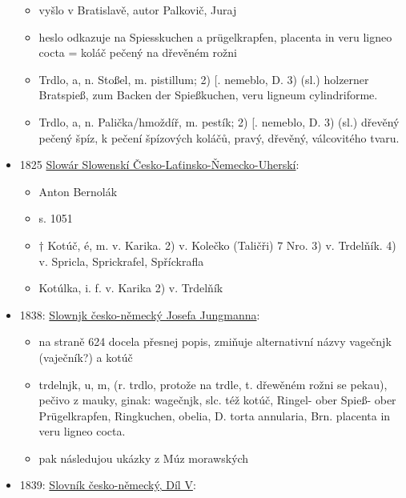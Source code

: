 \begin{itemize}
  \begin{itemize}
  \tightlist
  \item
    vyšlo v Bratislavě, autor Palkovič, Juraj
  \item
    heslo odkazuje na Spiesskuchen a prügelkrapfen, placenta in veru
    ligneo cocta = koláč pečený na dřevěném rožni
  \item
    Trdlo, a, n. Stoßel, m. pistillum; 2) {[}. nemeblo, D. 3) (sl.)
    holzerner Bratspieß, zum Backen der Spießkuchen, veru ligneum
    cylindriforme.
  \item
    Trdlo, a, n. Palička/hmoždíř, m. pestík; 2) {[}. nemeblo, D. 3)
    (sl.) dřevěný pečený špíz, k pečení špízových koláčů, pravý,
    dřevěný, válcovitého tvaru.
  \end{itemize}
\item
  1825
  \href{https://www.google.cz/books/edition/Slow\%C3\%A1r_Slowensk\%C3\%AD_\%C4\%8Cesko_La\%C5\%A5insko_\%C5\%87em/Sd1bAAAAcAAJ?hl=cs&gbpv=1&dq=trdeln\%C3\%ADk&pg=PA1051&printsec=frontcover}{Slowár
  Slowenskí Česko-Laťinsko-Ňemecko-Uherskí}:

  \begin{itemize}
  \tightlist
  \item
    Anton Bernolák
  \item
    s. 1051
  \item
    † Kotúč, é, m. v. Karika. 2) v. Kolečko (Taličři) 7 Nro. 3) v.
    Trdelňík. 4) v. Spricla, Sprickrafel, Spříckrafla
  \item
    Kotúlka, i. f. v. Karika 2) v. Trdelňík
  \end{itemize}
\item
  1838:
  \href{https://ndk.cz/uuid/uuid:b6d79670-8232-11dc-abad-000d606f5dc6}{Slownjk
  česko-německý Josefa Jungmanna}:

  \begin{itemize}
  \tightlist
  \item
    na straně 624 docela přesnej popis, zmiňuje alternativní názvy
    vagečnjk (vaječník?) a kotúč
  \item
    trdelnjk, u, m, (r. trdlo, protože na trdle, t. dřewěném rožni se
    pekau), pečivo z mauky, ginak: wagečnjk, slc. též kotúč, Ringel-
    ober Spieß- ober Prügelkrapfen, Ringkuchen, obelia, D. torta
    annularia, Brn. placenta in veru ligneo cocta.
  \item
    pak následujou ukázky z Múz morawských
  \end{itemize}
\item
  1839:
  \href{https://vokabular.ujc.cas.cz/moduly/slovniky/digitalni-kopie-detail/JgSlov05/strana-9}{Slovník
  česko-německý, Díl V}:


\end{itemize}

